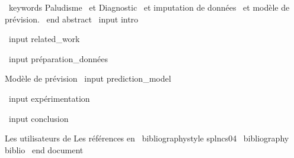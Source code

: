 \ keywords {Paludisme   \ et Diagnostic \ et imputation de données \ et modèle de prévision.}
\ end {abstract}
%
%
\ input {intro}

\ input {related_work}

\ input {préparation_données}

Modèle de prévision %
\ input {prediction_model}

\ input {expérimentation}

\ input {conclusion}

%
%
Les utilisateurs de %
Les références en %
%
\ bibliographystyle {splncs04}
\ bibliography {biblio}
%
\ end {document}
